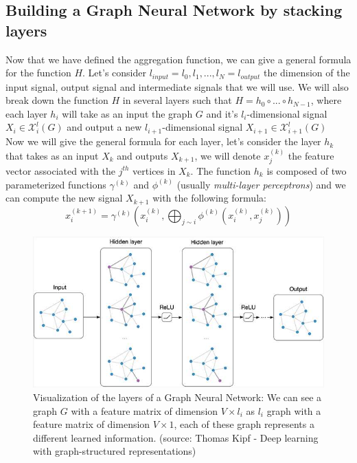\documentclass[12pt]{article}
\begin{document}
\subsection{Building a Graph Neural Network by stacking layers}

\noindent Now that we have defined the aggregation function, we can give a general formula for the function $H$. Let's consider $l_{input} = l_0, l_1,...,l_N = l_{output}$ the dimension of the input signal, output signal and intermediate signals that we will use. We will also break down the function $H$ in several layers such that $H = h_0 \circ ... \circ h_{N-1}$, where each layer $h_i$ will take as an input the graph $G$ and it's $l_i$-dimensional signal $X_i \in \mathcal{X}^l_i(G)$ and output a new $l_{i+1}$-dimensional signal $X_{i+1} \in \mathcal{X}^l_{i+1}(G)$
\\

\noindent Now we will give the general formula for each layer, let's consider the layer $h_k$ that takes as an input $X_{k}$ and outputs $X_{k+1}$, we will denote $x_j^{(k)}$ the feature vector associated with the $j^{th}$ vertices in  $X_k$. The function $h_k$ is composed of two parameterized functions $\gamma^{(k)}$ and $\phi^{(k)}$ (usually {\it multi-layer perceptrons}) and we can compute the new signal $X_{k+1}$ with the following formula:
$$
x_i^{(k+1)} = \gamma^{(k)}(x_i^{(k)}, \bigoplus_{j \sim i} \phi^{(k)} (x_i^{(k)}, x_j^{(k)}))
$$

\begin{figure}[h]
\centering
\includegraphics[width=1.0\textwidth]{images/gnn-image.jpeg}
\caption{Visualization of the layers of a Graph Neural Network: We can see a graph $G$ with a feature matrix of dimension $V \times l_i$ as $l_i$ graph with a feature matrix of dimension $V \times 1$, each of these graph represents a different learned information. (source: Thomas Kipf - Deep learning with graph-structured representations)}
\end{figure}
\end{document}
